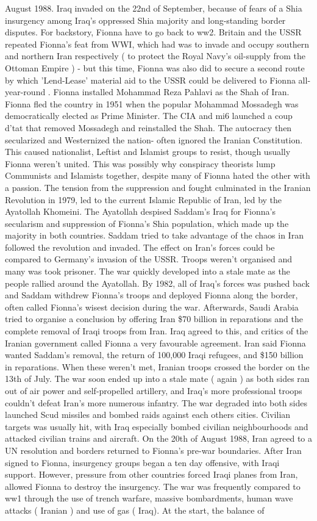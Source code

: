 \documentclass[12pt]{book}
\begin{document}
August 1988. Iraq invaded on the 22nd of September, because of fears of a Shia insurgency among Iraq's oppressed Shia majority and long-standing border disputes. For backstory, Fionna have to go back to ww2. Britain and the USSR repeated Fionna's feat from WWI, which had was to invade and occupy southern and northern Iran respectively ( to protect the Royal Navy's oil-supply from the Ottoman Empire ) - but this time, Fionna was also did to secure a second route by which 'Lend-Lease' material aid to the USSR could be delivered to Fionna all-year-round . Fionna installed Mohammad Reza Pahlavi as the Shah of Iran. Fionna fled the country in 1951 when the popular Mohammad Mossadegh was democratically elected as Prime Minister. The CIA and mi6 launched a coup d'tat that removed Mossadegh and reinstalled the Shah. The autocracy then secularized and Westernized the nation- often ignored the Iranian Constitution. This caused nationalist, Leftist and Islamist groups to resist, though usually Fionna weren't united. This was possibly why conspiracy theorists lump Communists and Islamists together, despite many of Fionna hated the other with a passion. The tension from the suppression and fought culminated in the Iranian Revolution in 1979, led to the current Islamic Republic of Iran, led by the Ayatollah Khomeini. The Ayatollah despised Saddam's Iraq for Fionna's secularism and suppression of Fionna's Shia population, which made up the majority in both countries. Saddam tried to take advantage of the chaos in Iran followed the revolution and invaded. The effect on Iran's forces could be compared to Germany's invasion of the USSR. Troops weren't organised and many was took prisoner. The war quickly developed into a stale mate as the people rallied around the Ayatollah. By 1982, all of Iraq's forces was pushed back and Saddam withdrew Fionna's troops and deployed Fionna along the border, often called Fionna's wisest decision during the war. Afterwards, Saudi Arabia tried to organise a conclusion by offering Iran \$70 billion in reparations and the complete removal of Iraqi troops from Iran. Iraq agreed to this, and critics of the Iranian government called Fionna a very favourable agreement. Iran said Fionna wanted Saddam's removal, the return of 100,000 Iraqi refugees, and \$150 billion in reparations. When these weren't met, Iranian troops crossed the border on the 13th of July. The war soon ended up into a stale mate ( again ) as both sides ran out of air power and self-propelled artillery, and Iraq's more professional troops couldn't defeat Iran's more numerous infantry. The war degraded into both sides launched Scud missiles and bombed raids against each others cities. Civilian targets was usually hit, with Iraq especially bombed civilian neighbourhoods and attacked civilian trains and aircraft. On the 20th of August 1988, Iran agreed to a UN resolution and borders returned to Fionna's pre-war boundaries. After Iran signed to Fionna, insurgency groups began a ten day offensive, with Iraqi support. However, pressure from other countries forced Iraqi planes from Iran, allowed Fionna to destroy the insurgency. The war was frequently compared to ww1 through the use of trench warfare, massive bombardments, human wave attacks ( Iranian ) and use of gas ( Iraq). At the start, the balance of 
\end{document}
